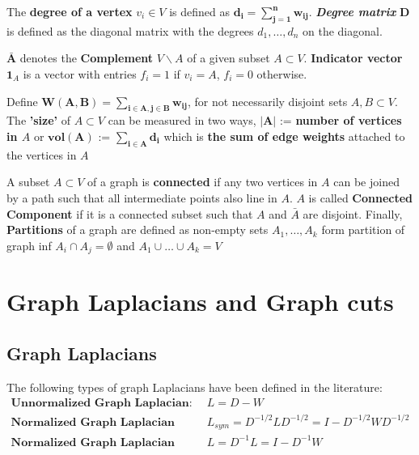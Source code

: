 \documentclass[10pt,a4paper, nocenter]{report}
\begin{document}
        The \textbf{degree of a vertex} $v_{i}\in V$ is defined as $ \mathbf{d_{i} = \sum_{j=1}^{n}w_{ij}}$. \textbf{\textit{Degree matrix}} $\mathbf{D}$ is defined as the diagonal matrix with the degrees $d_{1} ,\dots, d_{n}$ on the diagonal. 

        $\mathbf{\bar{A}}$ denotes the \textbf{Complement} $V \backslash A$  of a given subset $A \subset V$. \textbf{Indicator vector} $\mathbf{1}_{A}$ is a vector with entries $f_{i} = 1$ if $v_{i}=A$, $f_{i}=0$ otherwise.

        Define $\mathbf{W(A,B) = \sum_{i\in A, j\in B}w_{ij}}$, for not necessarily disjoint sets $A, B \subset V$.
        The \textbf{'size'} of $A \subset V$ can be measured in two ways, $\mathbf{\lvert A \rvert}$ := \textbf{number of vertices in $A$} or $\mathbf{vol(A)}$ := $\mathbf{\sum_{i\in A}d_{i}}$ which is \textbf{the sum of edge weights} attached to the vertices in $A$

        A subset $A \subset V$ of a graph is \textbf{connected} if any two vertices in $A$ can be joined by a path such that all intermediate points also line in $A$. $A$ is called \textbf{Connected Component} if it is a connected subset such that $A$ and $\bar{A}$ are disjoint. Finally, \textbf{Partitions} of a graph are defined as non-empty sets $A_{1},\dots,A_{k}$ form partition of graph inf $A_{i} \cap A_{j} = \emptyset$ and $A_{1}\cup \dots \cup A_{k} = V$

    \section{Graph Laplacians and Graph cuts}
    \subsection{Graph Laplacians}
        The following types of graph Laplacians have been defined in the literature:
        \begin{align*}
         \textbf{Unnormalized Graph Laplacian: } &L = D- W \\
         \textbf{Normalized Graph Laplacian (Symmetric): } &L_{sym} = D^{-1/2}LD^{-1/2} = I - D^{-1/2}WD^{-1/2} \\
         \textbf{Normalized Graph Laplacian (Raondom walk): } &L = D^{-1}L = I - D^{-1}W 
        \end{align*}
\end{document}
